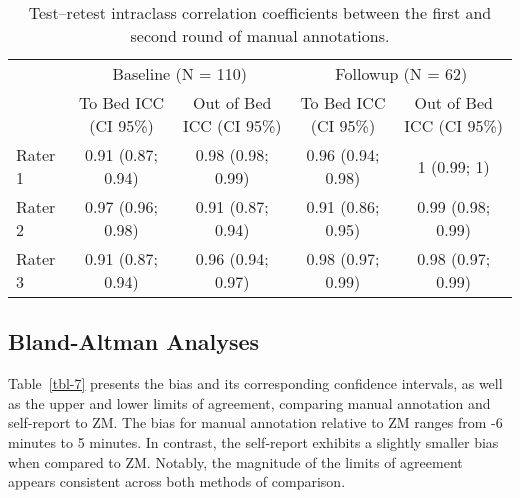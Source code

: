 \documentclass[
  9pt,
]{scrbook}
\begin{document}
\begingroup

\footnotesize

\hypertarget{tbl-man_icc_test_retest}{}
\begin{longtable}{lcccc}
\caption{\label{tbl-man_icc_test_retest}Test--retest intraclass correlation coefficients between the first and
second round of manual annotations. }\tabularnewline

\toprule
 & \multicolumn{2}{c}{Baseline (N = 110)} & \multicolumn{2}{c}{Followup (N = 62)} \\ 
\cmidrule(lr){2-3} \cmidrule(lr){4-5}
 & To Bed
ICC (CI 95\%) & Out of Bed
ICC (CI 95\%) & To Bed
ICC (CI 95\%) & Out of Bed
ICC (CI 95\%) \\ 
\midrule
Rater 1 & 0.91 (0.87; 0.94) & 0.98 (0.98; 0.99) & 0.96 (0.94; 0.98) & 1 (0.99; 1) \\ 
Rater 2 & 0.97 (0.96; 0.98) & 0.91 (0.87; 0.94) & 0.91 (0.86; 0.95) & 0.99 (0.98; 0.99) \\ 
Rater 3 & 0.91 (0.87; 0.94) & 0.96 (0.94; 0.97) & 0.98 (0.97; 0.99) & 0.98 (0.97; 0.99) \\ 
\bottomrule
\end{longtable}

\endgroup

\hypertarget{bland-altman-analyses}{%
\subsection{Bland-Altman Analyses}\label{bland-altman-analyses}}

Table~\ref{tbl-7} presents the bias and its corresponding confidence
intervals, as well as the upper and lower limits of agreement, comparing
manual annotation and self-report to ZM. The bias for manual annotation
relative to ZM ranges from -6 minutes to 5 minutes. In contrast, the
self-report exhibits a slightly smaller bias when compared to ZM.
Notably, the magnitude of the limits of agreement appears consistent
across both methods of comparison.

\begingroup

\footnotesize
\end{document}
